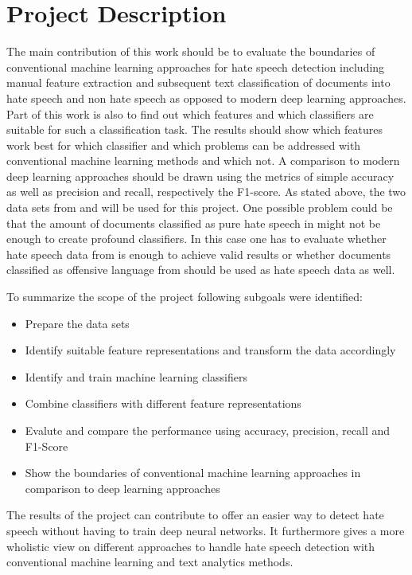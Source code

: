 \section{Project Description}

The main contribution of this work should be to evaluate the boundaries of conventional machine learning approaches for hate speech detection including manual feature extraction and subsequent text classification of documents into hate speech and non hate speech as opposed to modern deep learning approaches. Part of this work is also to find out which features and which classifiers are suitable for such a classification task. The results should show which features work best for which classifier and which problems can be addressed with conventional machine learning methods and which not. A comparison to modern deep learning approaches should be drawn using the metrics of simple accuracy as well as precision and recall, respectively the F1-score. As stated above, the two data sets from \cite{ThomasDavidson.2020} and \cite{OnadeGibert.2020} will be used for this project. One possible problem could be that the amount of documents classified as pure hate speech in \cite{ThomasDavidson.2020} might not be enough to create profound classifiers. In this case one has to evaluate whether hate speech data from \cite{OnadeGibert.2020} is enough to achieve valid results or whether documents classified as offensive language from \cite{ThomasDavidson.2020} should be used as hate speech data as well. 

\noindent
To summarize the scope of the project following subgoals were identified:

\begin{itemize}
	\item Prepare the data sets
	\item Identify suitable feature representations and transform the data accordingly
	\item Identify and train machine learning classifiers
	\item Combine classifiers with different feature representations
	\item Evalute and compare the performance using accuracy, precision, recall and F1-Score
	\item Show the boundaries of conventional machine learning approaches in comparison to deep learning approaches
\end{itemize}

\noindent
The results of the project can contribute to offer an easier way to detect hate speech without having to train deep neural networks. It furthermore gives a more wholistic view on different approaches to handle hate speech detection with conventional machine learning and text analytics methods. 



